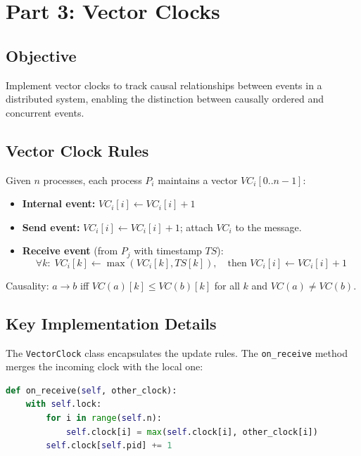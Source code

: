 \documentclass[12pt,a4paper]{article}
\begin{document}
\section{Part 3: Vector Clocks}

\subsection{Objective}

Implement vector clocks to track causal relationships between events in a distributed system, enabling the distinction between causally ordered and concurrent events.

\subsection{Vector Clock Rules}

Given $n$ processes, each process $P_i$ maintains a vector $VC_i[0..n-1]$:

\begin{itemize}
    \item \textbf{Internal event:} $VC_i[i] \gets VC_i[i] + 1$
    \item \textbf{Send event:} $VC_i[i] \gets VC_i[i] + 1$; attach $VC_i$ to the message.
    \item \textbf{Receive event} (from $P_j$ with timestamp $TS$):
    \[\forall k: \; VC_i[k] \gets \max(VC_i[k], TS[k]), \quad \text{then } VC_i[i] \gets VC_i[i] + 1\]
\end{itemize}

Causality: $a \rightarrow b$ iff $VC(a)[k] \leq VC(b)[k]$ for all $k$ and $VC(a) \neq VC(b)$.

\subsection{Key Implementation Details}

The \texttt{VectorClock} class encapsulates the update rules. The \texttt{on\_receive} method merges the incoming clock with the local one:

\begin{lstlisting}[language=Python, caption={Vector clock merge on receive}]
def on_receive(self, other_clock):
    with self.lock:
        for i in range(self.n):
            self.clock[i] = max(self.clock[i], other_clock[i])
        self.clock[self.pid] += 1
\end{lstlisting}
\end{document}
